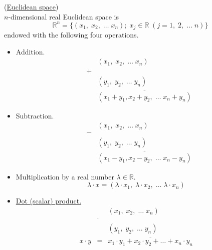 \documentclass[color=black,11pt]{elegantpaper}
\begin{document}
\begin{definition}
\label{def:Euclidean_space}
(\href{https://en.wikipedia.org/wiki/Euclidean_space}{Euclidean space})\\

 $n$-dimensional real Euclidean space is
$$
\mathbb{R}^n =\{(x_1,\; x_2,\; \dots \; x_n);\;x_j \in \mathbb{R}\;(j=1,\;2,\;\dots\;n)\}
$$
endowed with the following four operations.
\begin{itemize}
\item[]Addition.
\begin{eqnarray*}
&& (x_1,\;x_2,\;\dots\;x_n) \\
&+&\\
&& (y_1,\; y_2,\; \dots \; y_n)\\
&&\overline{(x_1+y_1,x_2+y_2, \; \dots \; x_n+y_n)}
\end{eqnarray*}
\item[]Subtraction.
\begin{eqnarray*}
&& (x_1,\;x_2,\;\dots\;x_n) \\
&-&\\
&& (y_1,\; y_2,\; \dots \; y_n)\\
&&\overline{(x_1-y_1,x_2-y_2, \; \dots \; x_n-y_n)}
\end{eqnarray*}
\item[] Multiplication by a real number $\lambda \in \mathbb{R}.$
$$
\lambda \cdot x = (\lambda \cdot x_1,\; \lambda \cdot x_2,\; \dots\; \lambda \cdot x_n)
$$
\item[] \href{https://en.wikipedia.org/wiki/Dot_product}{Dot (scalar)  product.} 
\begin{eqnarray*}
&& (x_1,\;x_2,\; \dots \; x_n) \\
&\cdot&\\
&& (y_1,\; y_2,\; \dots \; y_n)\\
x\cdot y&=&\overline{x_1\cdot y_1+x_2\cdot y_2+\dots + x_n \cdot y_n}
\end{eqnarray*}
\end{itemize}
\end{definition}
\end{document}
